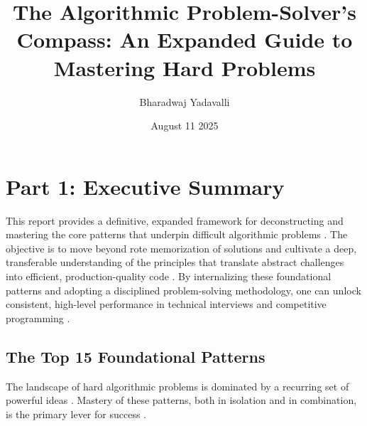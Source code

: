 \documentclass{article}
\title{The Algorithmic Problem-Solver's Compass: An Expanded Guide to Mastering Hard Problems}
\author{Bharadwaj Yadavalli}
\date{August 11 2025}
\begin{document}
\maketitle

\section{Part 1: Executive Summary}
This report provides a definitive, expanded framework for deconstructing and mastering the core patterns that underpin difficult algorithmic problems \cite{1, 3}. The objective is to move beyond rote memorization of solutions and cultivate a deep, transferable understanding of the principles that translate abstract challenges into efficient, production-quality code \cite{4}. By internalizing these foundational patterns and adopting a disciplined problem-solving methodology, one can unlock consistent, high-level performance in technical interviews and competitive programming \cite{5}.

\subsection{The Top 15 Foundational Patterns}
The landscape of hard algorithmic problems is dominated by a recurring set of powerful ideas \cite{7}. Mastery of these patterns, both in isolation and in combination, is the primary lever for success \cite{8}.
\end{document}
